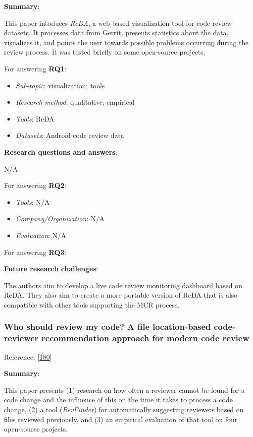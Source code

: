\documentclass[]{book}
\providecommand{\tightlist}{%
  \setlength{\itemsep}{0pt}\setlength{\parskip}{0pt}}
\begin{document}
\textbf{Summary}:

This paper intoduces \emph{ReDA}, a web-based visualization tool for
code review datasets. It processes data from Gerrit, presents statistics
about the data, visualizes it, and points the user towards possible
problems occurring during the review process. It was tested briefly on
some open-source projects.

For answering \textbf{RQ1}:

\begin{itemize}
\tightlist
\item
  \emph{Sub-topic}: visualization; tools
\item
  \emph{Research method}: qualitative; empirical
\item
  \emph{Tools}: ReDA
\item
  \emph{Datasets}: Android code review data
\end{itemize}

\textbf{Research questions and answers}:

N/A

For answering \textbf{RQ2}:

\begin{itemize}
\tightlist
\item
  \emph{Tools}: N/A
\item
  \emph{Company/Organization}: N/A
\item
  \emph{Evaluation}: N/A
\end{itemize}

For answering \textbf{RQ3}:

\textbf{Future research challenges}:

The authors aim to develop a live code review monitoring dashboard based
on ReDA. They also aim to create a more portable version of ReDA that is
also compatible with other tools supporting the MCR process.

\subsubsection{Who should review my code? A file location-based
code-reviewer recommendation approach for modern code
review}\label{who-should-review-my-code-a-file-location-based-code-reviewer-recommendation-approach-for-modern-code-review}

Reference: {[}\protect\hyperlink{ref-thongtanunam2015should}{180}{]}

\textbf{Summary}:

This paper presents (1) research on how often a reviewer cannot be found
for a code change and the influence of this on the time it takes to
process a code change, (2) a tool (\emph{RevFinder}) for automatically
suggesting reviewers based on files reviewed previously, and (3) an
empirical evaluation of that tool on four open-source projects.
\end{document}
